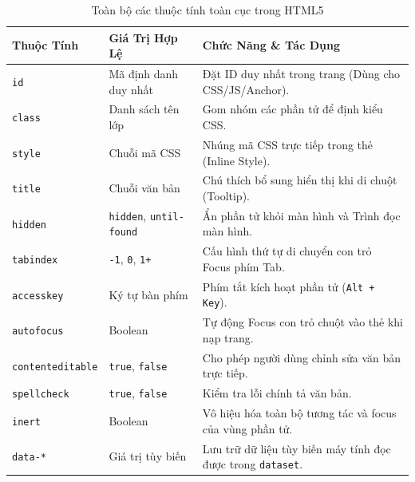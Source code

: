 \documentclass[11pt,oneside]{book}
\newcommand{\codeinline}[1]{\textcolor{accentOrange}{\texttt{#1}}}
\begin{document}
\begin{table}[H]
\centering
\begin{prettyTableBox}
\small
{}
\begin{tabularx}{\linewidth}{lp{3.5cm}X}
\rowcolor{primaryBlue}
\color{white}\textbf{Thuộc Tính} & \color{white}\textbf{Giá Trị Hợp Lệ} & \color{white}\textbf{Chức Năng \& Tác Dụng} \\
\hline
\codeinline{id} & Mã định danh duy nhất & Đặt ID duy nhất trong trang (Dùng cho CSS/JS/Anchor). \\
\codeinline{class} & Danh sách tên lớp & Gom nhóm các phần tử để định kiểu CSS. \\
\codeinline{style} & Chuỗi mã CSS & Nhúng mã CSS trực tiếp trong thẻ (Inline Style). \\
\codeinline{title} & Chuỗi văn bản & Chú thích bổ sung hiển thị khi di chuột (Tooltip). \\
\codeinline{hidden} & \codeinline{hidden}, \codeinline{until-found} & Ẩn phần tử khỏi màn hình và Trình đọc màn hình. \\
\codeinline{tabindex} & \codeinline{-1}, \codeinline{0}, \codeinline{1+} & Cấu hình thứ tự di chuyển con trỏ Focus phím Tab. \\
\codeinline{accesskey} & Ký tự bàn phím & Phím tắt kích hoạt phần tử (\codeinline{Alt + Key}). \\
\codeinline{autofocus} & Boolean & Tự động Focus con trỏ chuột vào thẻ khi nạp trang. \\
\codeinline{contenteditable} & \codeinline{true}, \codeinline{false} & Cho phép người dùng chỉnh sửa văn bản trực tiếp. \\
\codeinline{spellcheck} & \codeinline{true}, \codeinline{false} & Kiểm tra lỗi chính tả văn bản. \\
\codeinline{inert} & Boolean & Vô hiệu hóa toàn bộ tương tác và focus của vùng phần tử. \\
\codeinline{data-*} & Giá trị tùy biến & Lưu trữ dữ liệu tùy biến máy tính đọc được trong \codeinline{dataset}. \\
\end{tabularx}
\end{prettyTableBox}
\vspace{-2pt}
\caption{Toàn bộ các thuộc tính toàn cục trong HTML5}
\end{table}
\end{document}
